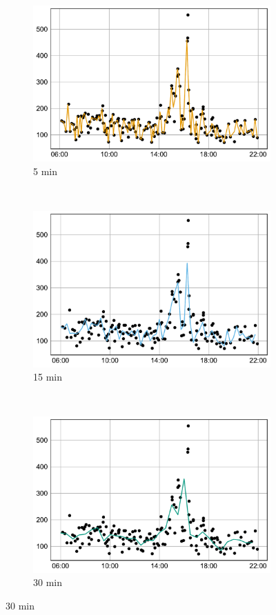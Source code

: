 ﻿\documentclass[preprint,11pt,5p,twocolumn]{elsarticle}
\begin{document}
\begin{figure}[!t]
    \centering
    \begin{subfigure}[t]{0.31\textwidth}
        \centering
        \includegraphics[width=\textwidth]{plots/decycle_5min_n.pdf}
        \caption{5 min}
    \end{subfigure}%
    ~ 
    \begin{subfigure}[t]{0.31\textwidth}
        \centering
        \includegraphics[width=\textwidth]{plots/decycle_15min_n.pdf}
        \caption{15 min}
    \end{subfigure}
    ~
    \begin{subfigure}[t]{0.31\textwidth}
        \centering
        \includegraphics[width=\textwidth]{plots/decycle_30min_n.pdf}
        \caption{30 min}
    \end{subfigure}


\end{figure}
\end{document}
